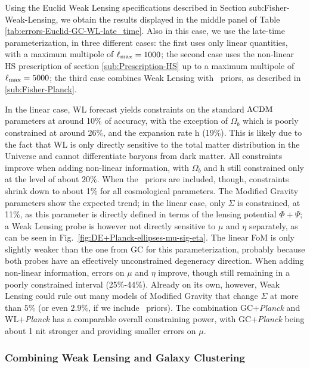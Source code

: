 Using the Euclid Weak Lensing specifications described in Section
sub:Fisher-Weak-Lensing, we obtain the results displayed in
the middle panel of Table \ref{tab:errors-Euclid-GC-WL-late_time}. 
Also in this case, we use the late-time parameterization, in three different cases: 
the first uses only linear quantities, with a maximum multipole of $\ell_{\rm max}=1000$; 
the second case uses the non-linear HS prescription of section \ref{sub:Prescription-HS} 
up to a maximum multipole of $\ell_{\rm max}=5000$; the third case combines Weak Lensing with \planck\ priors, 
as described in \ref{sub:Fisher-Planck}.

In the linear case, WL forecast yields constraints on the standard $\Lambda\mathrm{CDM}$ parameters
at around 10\% of accuracy, with the exception of $\Omega_{b}$ which
is poorly constrained at around 26\%, and the expansion rate h (19\%). This is likely due to the fact
that WL is only directly sensitive to the total matter distribution
in the Universe and cannot differentiate baryons from dark matter. All constraints improve when adding non-linear information, with $\Omega_b$ and h still constrained only at the level of about $20\%$. When the \planck\ priors are included, though, constraints shrink down to about 1$\%$ for all cosmological parameters.
The Modified Gravity parameters show the expected
trend; in the linear case, only $\Sigma$ is constrained, at 11$\%$, as this parameter is directly defined in terms of the lensing potential $\Phi+\Psi$; a Weak Lensing
probe is however not directly sensitive to $\mu$ and $\eta$ separately, as can be seen in Fig.\ \ref{fig:DE+Planck-ellipses-mu-sig-eta}.
The linear FoM is only slightly weaker than the one from GC for this parameterization, probably because both probes have an effectively unconstrained degeneracy direction. When adding non-linear information, errors on $\mu$ and $\eta$ improve, though still remaining in a poorly constrained interval (25$\%$-44$\%$).
Already on its own, however, Weak Lensing could rule out many
models of Modified Gravity that change $\Sigma$ at more than $5\%$ (or even $2.9\%$, if we include \planck\ priors). The combination GC+{\it Planck} 
and WL+{\it Planck} has a comparable overall constraining power, with GC+{\it Planck} being about 1 nit stronger and providing smaller errors on $\mu$.

\subsubsection{Combining Weak Lensing and Galaxy Clustering}\label{subsub:late-time-comb-GC+WL}

